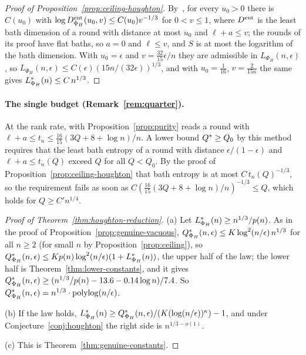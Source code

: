 \begin{proof}[Proof of Proposition~\ref{prop:ceiling-houghton}]
By~\cite[Proposition~4.14]{DouglasMghirbiB}, for every $u_0>0$ there is $C(u_0)$ with $\log D^{\rm ent}_{\Phi_H}(u_0,v)\le C(u_0)v^{-1/3}$ for $0<v\le1$, where $D^{\rm ent}$ is the least bath
dimension of a round with distance at most $u_0$ and $\ell+a\le v$; the rounds of its proof have flat baths, so $a=0$ and $\ell\le v$, and $S$ is at most the logarithm of the bath
dimension. With $u_0=\epsilon$ and $v=\frac{32}{15}\epsilon/n$ they are admissible in $L_{\Phi_H}(n,\epsilon)$, so $L_{\Phi_H}(n,\epsilon)\le C(\epsilon)(15n/(32\epsilon))^{1/3}$, and with
$u_0=\frac1{16}$, $v=\frac2{15n}$ the same gives $L^{*}_{\Phi_H}(n)\le C\,n^{1/3}$.
\end{proof}

\paragraph{The single budget (Remark~\ref{rem:quarter}).} At the rank rate, \cite[Theorem~5.2]{DouglasMghirbiB} with Proposition~\ref{prop:purity} reads a round with
$\ell+a\le t_n\le\frac{16}{15}(3Q+8+\log n)/n$. A lower bound $Q^{*}\ge Q_0$ by this method requires that the least bath entropy of a round with distance $\epsilon/(1-\epsilon)$ and
$\ell+a\le t_n(Q)$ exceed $Q$ for all $Q<Q_0$. By the proof of Proposition~\ref{prop:ceiling-houghton} that bath entropy is at most $C\,t_n(Q)^{-1/3}$, so the requirement fails as
soon as $C(\frac{16}{15}(3Q+8+\log n)/n)^{-1/3}\le Q$, which holds for $Q\ge C'n^{1/4}$.

\begin{proof}[Proof of Theorem~\ref{thm:houghton-reduction}]
(a) Let $L^{*}_{\Phi_H}(n)\ge n^{1/3}/p(n)$. As in the proof of Proposition~\ref{prop:genuine-vacuous}, $Q^{*}_{\Phi_H}(n,\epsilon)\le K\log^2(n/\epsilon)\,n^{1/3}$ for all $n\ge2$ (for small $n$
by Proposition~\ref{prop:ceiling}), so $Q^{*}_{\Phi_H}(n,\epsilon)\le Kp(n)\log^2(n/\epsilon)(1+L^{*}_{\Phi_H}(n))$, the upper half of the law; the lower half is Theorem~\ref{thm:lower-constants},
and it gives $Q^{*}_{\Phi_H}(n,\epsilon)\ge(n^{1/3}/p(n)-13.6-0.14\log n)/7.4$. So $Q^{*}_{\Phi_H}(n,\epsilon)=n^{1/3}\cdot\mathrm{polylog}(n/\epsilon)$.

(b) If the law holds, $L^{*}_{\Phi_H}(n)\ge Q^{*}_{\Phi_H}(n,\epsilon)/(K(\log(n/\epsilon))^\kappa)-1$, and under Conjecture~\ref{conj:houghton} the right side is $n^{1/3-o(1)}$.

(c) This is Theorem~\ref{thm:genuine-constants}.
\end{proof}

